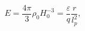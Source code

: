 \begin{equation}
E=\frac{4\pi }{3}\rho _{0}H_{0}^{-3}=\frac{\varepsilon }{q}\frac{r}{l_{p}^{2}%
},
\end{equation}

